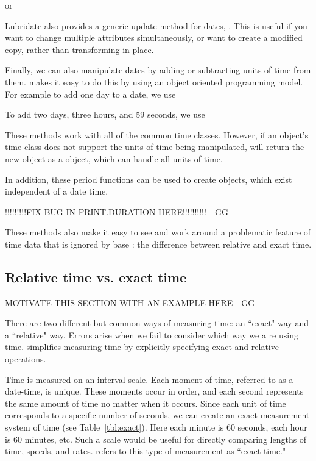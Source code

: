 \documentclass[article]{jss}
\begin{document}

or


Lubridate also provides a generic update method for dates, .  This is useful if you want to change multiple attributes simultaneously, or want to create a modified copy, rather than transforming in place.


Finally, we can also manipulate dates by adding or subtracting units of time from them.  makes it easy to do this by using an object oriented programming model. For example to add one day to a date, we use


To add two days, three hours, and 59 seconds, we use


These methods work with all of the common time classes. However, if an object's time class does not support the units of time being manipulated,  will return the new object as a  object, which can handle all units of time.

In addition, these period functions can be used to create  objects, which exist independent of a date time.


!!!!!!!!!FIX BUG IN PRINT.DURATION HERE!!!!!!!!!! - GG

These methods also make it easy to see and work around a problematic feature of time data that is ignored by base : the difference between relative and exact time.


\subsection{Relative time vs. exact time}

MOTIVATE THIS SECTION WITH AN EXAMPLE HERE - GG

There are two different but common ways of measuring time: an ``exact" way and a ``relative" way.  Errors arise when we fail to consider which way we a re using time.   simplifies measuring time by explicitly specifying exact and relative operations.

Time is measured on an interval scale. Each moment of time, referred to as a date-time, is unique.  These moments occur in order, and each second represents the same amount of time no matter when it occurs.  Since each unit of time corresponds to a specific number of seconds, we can create an exact measurement system of time (see Table~\ref{tbl:exact}). Here each minute is 60 seconds, each hour is 60 minutes, etc. Such a scale would be useful for directly comparing lengths of time, speeds, and rates.  refers to this type of measurement as ``exact time."
\end{document}
